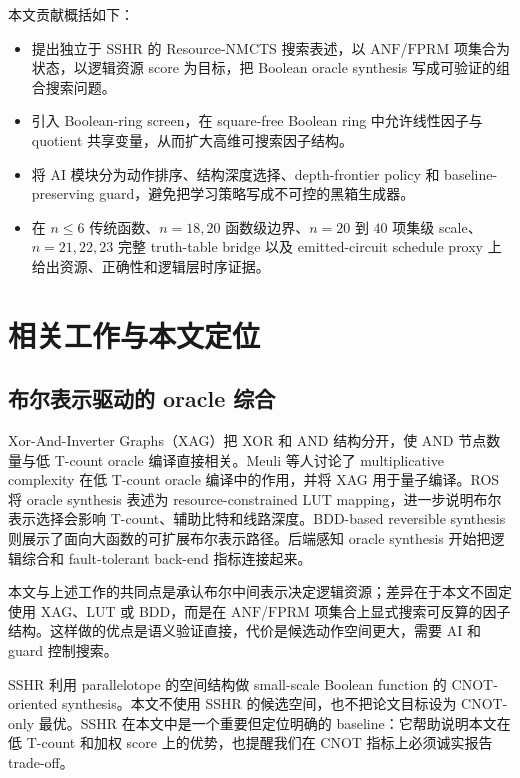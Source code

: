 \documentclass[UTF8,fontset=macnew,11pt]{ctexart}
\newcommand{\method}{Resource-NMCTS}
\newcommand{\screen}{Boolean-ring screen}
\newcommand{\anf}{\ensuremath{\mathrm{ANF}}}
\newcommand{\fprm}{\ensuremath{\mathrm{FPRM}}}
\newcommand{\ttable}{truth-table}
\begin{document}
本文贡献概括如下：
\begin{itemize}
  \item 提出独立于 SSHR 的 \method{} 搜索表述，以 \anf{}/\fprm{} 项集合为状态，以逻辑资源 score 为目标，把 Boolean oracle synthesis 写成可验证的组合搜索问题。
  \item 引入 \screen{}，在 square-free Boolean ring 中允许线性因子与 quotient 共享变量，从而扩大高维可搜索因子结构。
  \item 将 AI 模块分为动作排序、结构深度选择、depth-frontier policy 和 baseline-preserving guard，避免把学习策略写成不可控的黑箱生成器。
  \item 在 $n\leq6$ 传统函数、$n=18,20$ 函数级边界、$n=20$ 到 $40$ 项集级 scale、$n=21,22,23$ 完整 \ttable{} bridge 以及 emitted-circuit schedule proxy 上给出资源、正确性和逻辑层时序证据。
\end{itemize}

\section{相关工作与本文定位}

\subsection{布尔表示驱动的 oracle 综合}

Xor-And-Inverter Graphs（XAG）把 XOR 和 AND 结构分开，使 AND 节点数量与低 T-count oracle 编译直接相关。Meuli 等人讨论了 multiplicative complexity 在低 T-count oracle 编译中的作用\cite{meuli2019multiplicative}，并将 XAG 用于量子编译\cite{meuli2022xag}。ROS 将 oracle synthesis 表述为 resource-constrained LUT mapping\cite{meuli2020ros}，进一步说明布尔表示选择会影响 T-count、辅助比特和线路深度。BDD-based reversible synthesis 则展示了面向大函数的可扩展布尔表示路径\cite{wille2009bdd}。后端感知 oracle synthesis 开始把逻辑综合和 fault-tolerant back-end 指标连接起来\cite{yu2025backend}。

本文与上述工作的共同点是承认布尔中间表示决定逻辑资源；差异在于本文不固定使用 XAG、LUT 或 BDD，而是在 \anf{}/\fprm{} 项集合上显式搜索可反算的因子结构。这样做的优点是语义验证直接，代价是候选动作空间更大，需要 AI 和 guard 控制搜索。

SSHR 利用 parallelotope 的空间结构做 small-scale Boolean function 的 CNOT-oriented synthesis\cite{zheng2025sshr}。本文不使用 SSHR 的候选空间，也不把论文目标设为 CNOT-only 最优。SSHR 在本文中是一个重要但定位明确的 baseline：它帮助说明本文在低 T-count 和加权 score 上的优势，也提醒我们在 CNOT 指标上必须诚实报告 trade-off。
\end{document}
